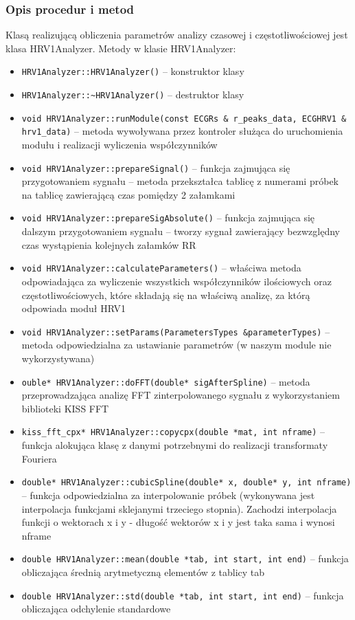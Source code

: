 \documentclass[a4paper, 11pt]{article}
\begin{document}
\subsubsection{Opis procedur i metod}
\label{sec:hrv1:procs}
Klasą realizującą obliczenia parametrów analizy czasowej i częstotliwościowej jest klasa HRV1Analyzer.
Metody w klasie HRV1Analyzer:
\begin{itemize}
\item \verb+HRV1Analyzer::HRV1Analyzer()+ -- konstruktor klasy
\item \verb+HRV1Analyzer::~HRV1Analyzer()+ -- destruktor klasy
\item \verb+void HRV1Analyzer::runModule(const ECGRs & r_peaks_data, ECGHRV1 & hrv1_data)+ -- metoda wywoływana przez kontroler służąca do uruchomienia modułu i realizacji wyliczenia współczynników
\item \verb+void HRV1Analyzer::prepareSignal()+ -- funkcja zajmująca się przygotowaniem sygnału -- metoda przekształca tablicę z numerami próbek na tablicę zawierającą czas pomiędzy 2 załamkami
\item \verb+void HRV1Analyzer::prepareSigAbsolute()+ -- funkcja zajmująca się dalszym przygotowaniem sygnału -- tworzy sygnał zawierający bezwzględny czas wystąpienia kolejnych załamków RR
\item \verb+void HRV1Analyzer::calculateParameters()+ -- właściwa metoda odpowiadająca za wyliczenie wszystkich współczynników ilościowych oraz częstotliwościowych, które składają się na właściwą analizę, za którą odpowiada moduł HRV1
\item \verb+void HRV1Analyzer::setParams(ParametersTypes &parameterTypes)+ -- metoda odpowiedzialna za ustawianie parametrów (w naszym module nie wykorzystywana)
\item \verb+ouble* HRV1Analyzer::doFFT(double* sigAfterSpline)+ -- metoda przeprowadzająca analizę FFT zinterpolowanego sygnału z wykorzystaniem biblioteki KISS FFT
\item \verb+kiss_fft_cpx* HRV1Analyzer::copycpx(double *mat, int nframe)+ -- funkcja alokująca klasę z danymi potrzebnymi do realizacji transformaty Fouriera
\item \verb+double* HRV1Analyzer::cubicSpline(double* x, double* y, int nframe)+ -- funkcja odpowiedzialna za interpolowanie próbek (wykonywana jest interpolacja funkcjami sklejanymi trzeciego stopnia). Zachodzi interpolacja funkcji o wektorach x i y - długość wektorów x i y jest taka sama i wynosi nframe
\item \verb+double HRV1Analyzer::mean(double *tab, int start, int end)+ -- funkcja obliczająca średnią arytmetyczną elementów z tablicy tab
\item \verb+double HRV1Analyzer::std(double *tab, int start, int end)+ -- funkcja obliczająca odchylenie standardowe
\end{itemize}
\end{document}
